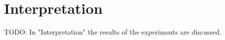\documentclass[Bachelorarbeit.tex]{subfiles}
\begin{document}
\chapter{Interpretation}
TODO:
In "Interpretation" the results of the experiments are discussed.
\end{document}
